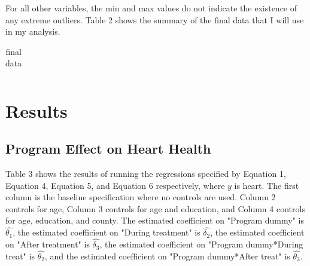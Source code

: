 \documentclass[a4paper]{article}
\begin{document}
For all other variables, the min and max values do not indicate the existence of any extreme outliers. Table 2 shows the summary of the final data that I will use in my analysis.

\begin{table}[H]
\caption{final data}
\centering
\begin{tabular}{|r|r|r|r|}

\end{tabular}
\end{table}


\section{Results}

\subsection{Program Effect on Heart Health}
Table 3 shows the results of running the regressions specified by Equation 1, Equation 4, Equation 5, and Equation 6 respectively, where $y$ is heart. The first column is the baseline specification where no controls are used. Column 2 controls for age, Column 3 controls for age and education, and Column 4 controls for age, education, and county. The estimated coefficient on "Program dummy" is $\hat{\theta_{1}}$, the estimated coefficient on "During treatment" is $\hat{\delta_{2}}$, the estimated coefficient on "After treatment" is $\hat{\delta_{3}}$, the estimated coefficient on "Program dummy*During treat" is $\hat{\theta_{2}}$, and the estimated coefficient on "Program dummy*After treat" is $\hat{\theta_{3}}$. 

\begin{table}[H]
\centering

\end{table}
\end{document}
